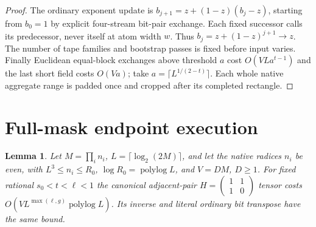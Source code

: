 \documentclass[11pt]{article}
\newcommand{\Oh}{O}
\newtheorem{lemma}[theorem]{Lemma}
\begin{document}
\begin{proof}
The ordinary exponent update is
$b_{j+1}=z+(1-z)(b_j-z)$, starting from $b_0=1$ by explicit four-stream
bit-pair exchange. Each fixed successor calls its predecessor, never
itself at atom width $w$. Thus $b_j=z+(1-z)^{j+1}\to z$. The number
of tape families and bootstrap passes is fixed before input varies.
Finally Euclidean equal-block exchanges above threshold $a$ cost
$\Oh(VLa^{t-1})$ and the last short field costs $\Oh(Va)$; take
$a=\lceil L^{1/(2-t)}\rceil$. Each whole native aggregate range is
padded once and cropped after its completed rectangle.
\end{proof}

\section{Full-mask endpoint execution}
\begin{lemma}\label{lem:endpoint}
Let $M=\prod_i n_i$, $L=\lceil\log_2(2M)\rceil$, and let the native
radices $n_i$ be even, with $L^3\le n_i\le R_0$,
$\log R_0=\operatorname{polylog}L$, and $V=DM$, $D\ge1$.
For fixed rational $s_0<t<\ell<1$ the canonical adjacent-pair
$H=\left(\begin{smallmatrix}1&1\\1&0\end{smallmatrix}\right)$ tensor
costs $\Oh(VL^{\max(\ell,g)}\operatorname{polylog}L)$.
Its inverse and literal ordinary bit transpose have the same bound.
\end{lemma}
\end{document}
